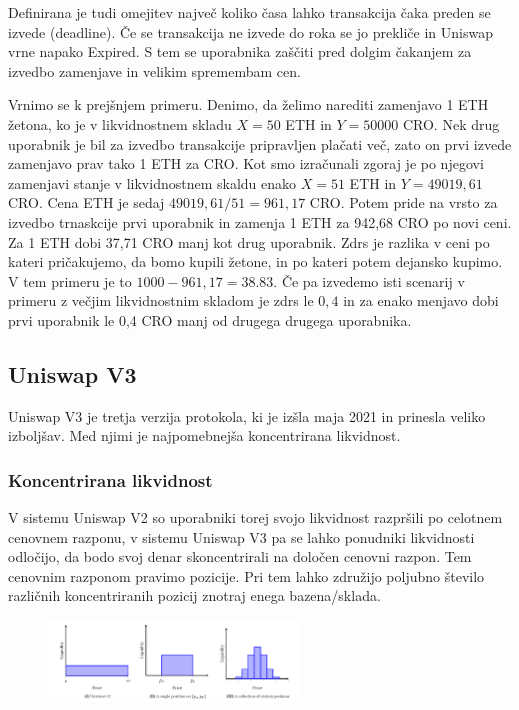 \documentclass[a4paper,12pt]{article}%
\begin{document}
Definirana je tudi omejitev največ koliko časa lahko transakcija čaka preden se izvede (deadline). Če se transakcija ne izvede do roka se jo prekliče in Uniswap vrne napako Expired. S tem se uporabnika zaščiti pred dolgim čakanjem za izvedbo zamenjave in velikim spremembam cen.

\medskip

Vrnimo se k prejšnjem primeru. Denimo, da želimo narediti zamenjavo 1 ETH žetona, ko je v likvidnostnem skladu $X = 50$ ETH in $Y = 50 000$ CRO. Nek drug uporabnik je bil za izvedbo transakcije pripravljen plačati več, zato on prvi izvede zamenjavo prav tako 1 ETH za CRO. Kot smo izračunali zgoraj je po njegovi zamenjavi stanje v likvidnostnem skaldu enako $X = 51$ ETH in $Y = 49019,61$ CRO. Cena ETH je sedaj $49019,61/51 = 961,17$ CRO. Potem pride na vrsto za izvedbo trnaskcije prvi uporabnik in zamenja 1 ETH za 942,68 CRO po novi ceni. Za 1 ETH dobi 37,71 CRO manj kot drug uporabnik.
Zdrs je razlika v ceni po kateri pričakujemo, da bomo kupili žetone, in po kateri potem dejansko kupimo. V tem primeru je to $1000 - 961,17 = 38.83$. 
Če pa izvedemo isti scenarij v primeru z večjim likvidnostnim skladom je zdrs le $0,4$ in za enako menjavo dobi prvi uporabnik le 0,4 CRO manj od drugega drugega uporabnika.

\subsection{Uniswap V3}

Uniswap V3 je tretja verzija protokola, ki je izšla maja 2021 in prinesla veliko izboljšav. Med njimi je najpomebnejša koncentrirana likvidnost. 

\subsubsection{Koncentrirana likvidnost}

V sistemu Uniswap V2 so uporabniki torej svojo likvidnost razpršili po celotnem cenovnem razponu, v sistemu Uniswap V3 pa se lahko ponudniki likvidnosti odločijo, da bodo svoj denar skoncentrirali na določen cenovni razpon. Tem cenovnim razponom pravimo pozicije. 
Pri tem lahko združijo poljubno število različnih koncentriranih pozicij znotraj enega bazena/sklada.

\begin{figure}[!ht]
    \centering
    \includegraphics[width=0.6\textwidth]{pozicije.png}
\end{figure}
\end{document}
